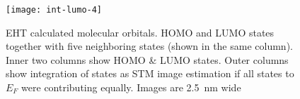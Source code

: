 \begin{figure}[h!]
{		\texttt{[image: int-lumo-4]}
		\label{fig:}	
	}
	\caption{EHT calculated molecular orbitals. HOMO and LUMO states together with five neighboring states (shown in the same column). Inner two columns show HOMO \& LUMO states. Outer columns show integration of states as STM image estimation if all states to $E_F$ were contributing equally. Images are \SI{2.5}{\nano \meter} wide}
	\label{fig:}
\end{figure}
\vfill